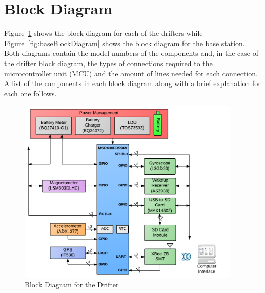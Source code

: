 \section{Block Diagram}

Figure~\ref{fig:drifterBlockDiagram} shows the block diagram for each of the drifters while Figure~\ref{fig:baseBlockDiagram} shows the block diagram for the base station.  Both diagrams contain the model numbers of the components and, in the case of the drifter block diagram, the types of connections required to the microcontroller unit (MCU) and the amount of lines needed for each connection.  A list of the components in each block diagram along with a brief explanation for each one follows.

\begin{figure}[ht]
	\centering
	\includegraphics[width=0.95\textwidth]{img/blockDiagram}
	\caption{Block Diagram for the Drifter \label{fig:drifterBlockDiagram}}
\end{figure}

